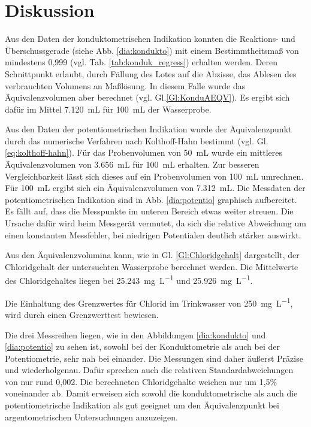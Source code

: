 \newpage
\section{Diskussion}
\label{sec:diskussion}

Aus den  Daten der konduktometrischen Indikation konnten die Reaktions- und Überschussgerade (siehe Abb. \ref{dia:kondukto}) mit einem Bestimmtheitsmaß von mindestens 0,999 (vgl. Tab. \ref{tab:konduk_regress}) erhalten werden. Deren Schnittpunkt erlaubt, durch Fällung des Lotes auf die Abzisse, das Ablesen des verbrauchten Volumens an Maßlösung. In diesem Falle wurde das Äquivalenzvolumen aber berechnet (vgl. Gl.\eqref{Gl:KonduAEQV}). Es ergibt sich dafür im Mittel \SI{7,120}{\milli\liter} für \SI{100}{\milli\liter} der Wasserprobe. 

Aus den Daten der potentiometrischen Indikation wurde der Äquivalenzpunkt durch das numerische Verfahren nach Kolthoff-Hahn bestimmt (vgl. Gl. \eqref{eq:kolthoff-hahn}). Für das Probenvolumen von \SI{50}{\milli\liter} wurde ein mittleres Äquivalenzvolumen von \SI{3,656}{\milli\liter} für \SI{100}{\milli\liter} erhalten. Zur besseren Vergleichbarkeit lässt sich dieses auf ein Probenvolumen von \SI{100}{\milli\liter} umrechnen. Für \SI{100}{\milli\liter} ergibt sich ein Äquivalenzvolumen von \SI{7,312}{\milli\liter}. Die Messdaten der potentiometrischen Indikation sind in Abb. \ref{dia:potentio} graphisch aufbereitet. Es fällt auf, dass die Messpunkte im unteren Bereich etwas weiter streuen. Die Ursache dafür wird beim Messgerät vermutet, da sich die relative Abweichung um einen konstanten Messfehler, bei niedrigen Potentialen deutlich stärker auswirkt. 


Aus den Äquivalenzvolumina kann, wie in Gl. \eqref{Gl:Chloridgehalt} dargestellt, der Chloridgehalt der untersuchten Wasserprobe berechnet werden. Die Mittelwerte des Chloridgehaltes liegen bei \SI{25,243}{\milli\gram\per\liter} und \SI{25,926}{\milli\gram\per\liter}. 




Die Einhaltung des Grenzwertes für Chlorid im Trinkwasser von \SI{250}{\milli\gram\per\liter}, wird durch einen Grenzwerttest bewiesen. 








Die drei Messreihen liegen, wie in den Abbildungen \ref{dia:kondukto} und \ref{dia:potentio} zu sehen ist, sowohl bei der Konduktometrie als auch bei der Potentiometrie, sehr nah bei einander. Die Messungen sind daher äußerst Präzise und wiederholgenau. Dafür sprechen auch die relativen Standardabweichungen von nur rund 0,002. Die berechneten Chloridgehalte weichen nur um 1,5\% voneinander ab. 
Damit erweisen sich sowohl die konduktometrische als auch die potentiometrische Indikation als gut geeignet um den Äquivalenzpunkt bei argentometrischen Untersuchungen anzuzeigen.

